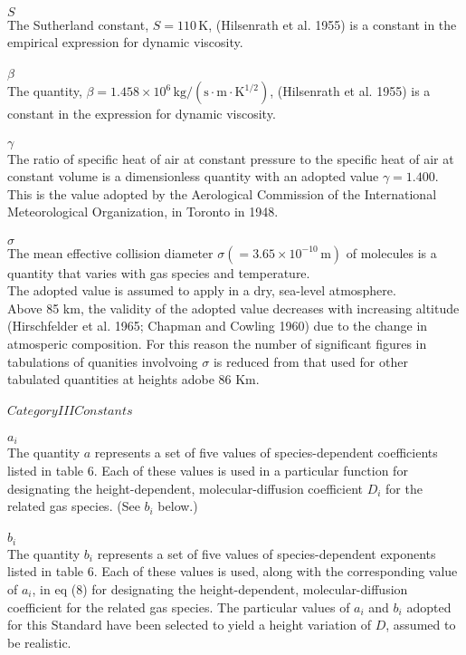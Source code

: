 \documentclass{article}
\begin{document}
\\$S$\\
The Sutherland constant, $S = 110 \, \mathrm{K}$, (Hilsenrath et al. 1955) is a constant in the empirical expression for dynamic viscosity.\\
\\$\beta$\\
The quantity, $\beta = 1.458 \times 10^{6} \, \mathrm{kg/(s \cdot m \cdot K^{1/2})}$, (Hilsenrath et al. 1955) is a constant in the expression for dynamic viscosity.\\
\\$\gamma$\\
The ratio of specific heat of air at constant pressure to the specific heat of air at constant volume is a dimensionless quantity with an adopted value $\gamma = 1.400$.\\
This is the value adopted by the Aerological Commission of the International Meteorological Organization, in Toronto in 1948.\\
\\$\sigma$\\
The mean effective collision diameter $\sigma (= 3.65 \times 10^{-10} \, \mathrm{m})$ of molecules is a quantity that varies with gas species and temperature.\\
The adopted value is assumed to apply in a dry, sea-level atmosphere.\\
Above 85 km, the validity of the adopted value decreases with increasing altitude (Hirschfelder et al. 1965; Chapman and Cowling 1960) due to the change in atmosperic composition. For this reason the number of significant figures in tabulations of quanities involvoing $\sigma$ is reduced from that used for other tabulated quantities at heights adobe 86 Km.\\
\\$Category III Constants$\\
\\$a_i$\\
The quantity $a$ represents a set of five values of species-dependent coefficients listed in table 6. Each of these values is used in a particular function for designating the height-dependent, molecular-diffusion coefficient $D_i$ for the related gas species. (See $b_i$ below.)\\
\\$b_i$\\
The quantity $b_i$ represents a set of five values of species-dependent exponents listed in table 6. Each of these values is used, along with the corresponding value of $a_i$, in eq (8) for designating the height-dependent, molecular-diffusion coefficient for the related gas species. The particular values of $a_i$ and $b_i$ adopted for this Standard have been selected to yield a height variation of $D$, assumed to be realistic.\\
\end{document}
